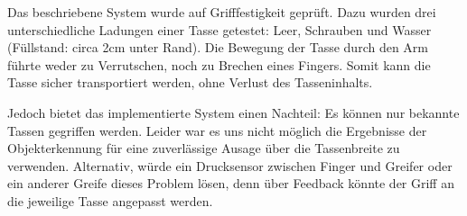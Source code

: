 Das beschriebene System wurde auf Grifffestigkeit geprüft. Dazu wurden drei unterschiedliche Ladungen einer Tasse getestet: Leer, Schrauben und Wasser (Füllstand: circa 2cm unter Rand). Die Bewegung der Tasse durch den Arm führte weder zu Verrutschen, noch zu Brechen eines Fingers. Somit kann die Tasse sicher transportiert werden, ohne Verlust des Tasseninhalts.

Jedoch bietet das implementierte System einen Nachteil: Es können nur bekannte Tassen gegriffen werden. Leider war es uns nicht möglich die Ergebnisse der Objekterkennung für eine zuverlässige Ausage über die Tassenbreite zu verwenden. Alternativ, würde ein Drucksensor zwischen Finger und Greifer oder ein anderer Greife dieses Problem lösen, denn über Feedback könnte der Griff an die jeweilige Tasse angepasst werden. 
